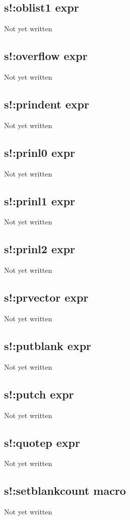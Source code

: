 \documentclass[a4paper,11pt]{article}
\begin{document}
{\subsection{\ttfamily s!:oblist1 expr}
   Not yet written

\subsection{\ttfamily s!:overflow expr}
   Not yet written

\subsection{\ttfamily s!:prindent expr}
   Not yet written

\subsection{\ttfamily s!:prinl0 expr}
   Not yet written

\subsection{\ttfamily s!:prinl1 expr}
   Not yet written

\subsection{\ttfamily s!:prinl2 expr}
   Not yet written

\subsection{\ttfamily s!:prvector expr}
   Not yet written

\subsection{\ttfamily s!:putblank expr}
   Not yet written

\subsection{\ttfamily s!:putch expr}
   Not yet written

\subsection{\ttfamily s!:quotep expr}
   Not yet written

\subsection{\ttfamily s!:setblankcount macro}
   Not yet written

}
\end{document}
